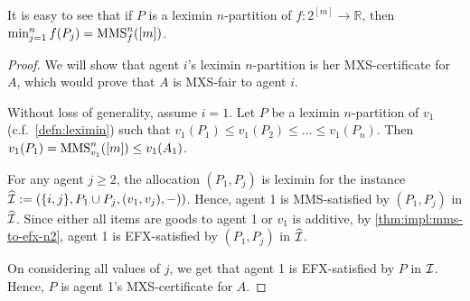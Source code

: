 It is easy to see that if $P$ is a leximin $n$-partition of $f: 2^{[m]} \to \mathbb{R}$,
then $\min_{j=1}^n f(P_j) = \mathrm{MMS}_f^n([m])$.

\begin{proof}
We will show that agent $i$'s leximin $n$-partition is her MXS-certificate for $A$,
which would prove that $A$ is MXS-fair to agent $i$.

Without loss of generality, assume $i = 1$.
Let $P$ be a leximin $n$-partition of $v_1$ (c.f.~\cref{defn:leximin})
such that $v_1(P_1) \le v_1(P_2) \le \ldots \le v_1(P_n)$.
Then $v_1(P_1) = \mathrm{MMS}_{v_1}^n([m]) \le v_1(A_1)$.

For any agent $j \ge 2$, the allocation $(P_1, P_j)$ is leximin for
the instance $\widehat{\mathcal{I}} := (\{i, j\},\allowbreak P_1 \cup P_j,\allowbreak (v_1, v_j),\allowbreak -))$.
Hence, agent 1 is MMS-satisfied by $(P_1, P_j)$ in $\widehat{\mathcal{I}}$.
Since either all items are goods to agent 1 or $v_1$ is additive,
by \cref{thm:impl:mms-to-efx-n2}, agent 1 is EFX-satisfied by $(P_1, P_j)$ in $\widehat{\mathcal{I}}$.

On considering all values of $j$, we get that agent 1 is EFX-satisfied by $P$ in $\mathcal{I}$.
Hence, $P$ is agent 1's MXS-certificate for $A$.
\end{proof}

